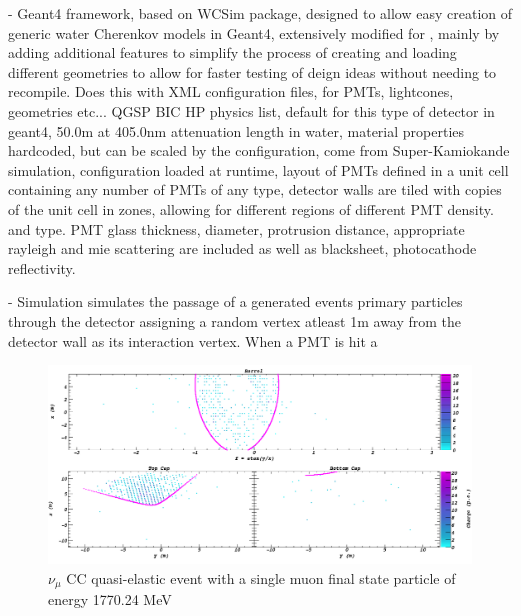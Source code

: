 - Geant4 framework, based on WCSim package, designed to allow easy creation of generic water
Cherenkov models in Geant4, extensively modified for \chips, mainly by adding additional features
to simplify the process of creating and loading different geometries to allow for faster testing
of deign ideas without needing to recompile. Does this with XML configuration files, for PMTs,
lightcones, geometries etc... QGSP BIC HP physics list, default for this type of detector in
geant4, 50.0m at 405.0nm attenuation length in water, material properties hardcoded, but can be
scaled by the configuration, come from Super-Kamiokande simulation, configuration loaded at
runtime, layout of PMTs defined in a unit cell containing any number of PMTs of any type, detector
walls are tiled with copies of the unit cell in zones, allowing for different regions of different
PMT density. and type. PMT glass thickness, diameter, protrusion distance, appropriate rayleigh
and mie scattering are included as well as blacksheet, photocathode reflectivity.

- Simulation simulates the passage of a generated events primary particles through the detector
assigning a random vertex atleast 1m away from the detector wall as its interaction vertex. When a
PMT is hit a

\begin{figure} %
    \includegraphics[width=\textwidth]{diagrams/4-chips/sim_event.png}
    \caption[sim event short]
    {$\nu_{\mu}$ CC quasi-elastic event with a single muon final state particle of energy
        1770.24 MeV}
    \label{fig:sim_event}
\end{figure}

